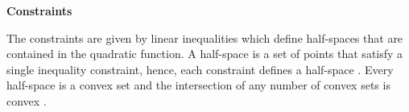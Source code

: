 \textbf{Constraints}

The constraints are given by linear inequalities which define half-spaces that are contained in the quadratic function. A half-space is a set of points that satisfy a single inequality constraint, hence, each constraint defines a half-space \cite{van2005formulation}. Every half-space is a convex set and the intersection of any number of convex sets is convex \cite{Convex_constraints}.

